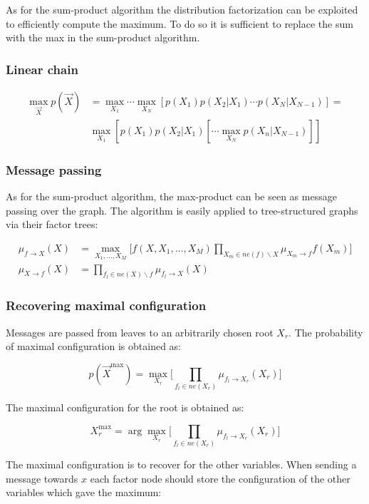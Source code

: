 	As for the sum-product algorithm the distribution factorization can be exploited to efficiently compute the maximum.
	To do so it is sufficient to replace the sum with the max in the sum-product algorithm.

		\subsubsection{Linear chain}

		\begin{align*}
			\max\limits_{\vec{X}}p(\vec{X}) &= \max\limits_{X_1}\cdots\max\limits_{X_N}[p(X_1)p(X_2|X_1)\cdots p(X_N|X_{N-1})]=\\
																			&\max\limits_{X_1}[p(X_1)p(X_2|X_1)[\cdots\max\limits_{X_N}p(X_n|X_{N-1})]]
		\end{align*}

		\subsubsection{Message passing}
		As for the sum-product algorithm, the max-product can be seen as message passing over the graph.
		The algorithm is easily applied to tree-structured graphs via their factor trees:

		\begin{align*}
			\mu_{f\rightarrow X}(X) &= \max\limits_{X_1, \dots, X_M}\biggl[f(X, X_1,\dots, X_M)\prod\limits_{X_m\in ne(f)\backslash X}\mu_{X_m\rightarrow f}f(X_m)\biggr]\\
			\mu_{X\rightarrow f}(X) &= \prod\limits_{f_l\in ne(X)\backslash f}\mu_{f_l\rightarrow X}(X)
		\end{align*}

		\subsubsection{Recovering maximal configuration}
		Messages are passed from leaves to an arbitrarily chosen root $X_r$.
		The probability of maximal configuration is obtained as:

		$$p(\vec{X}^{\max}) = \max\limits_{X_r}\biggl[\prod\limits_{f_l\in ne(X_r)}\mu_{f_l\rightarrow X_r}(X_r)\biggr]$$

		The maximal configuration for the root is obtained as:

		$$X_r^{\max} = \arg\max\limits_{X_r}\biggl[\prod\limits_{f_l\in ne(X_r)}\mu_{f_l\rightarrow X_r}(X_r)\biggr]$$

		The maximal configuration is to recover for the other variables.
		When sending a message towards $x$ each factor node should store the configuration of the other variables which gave the maximum:

